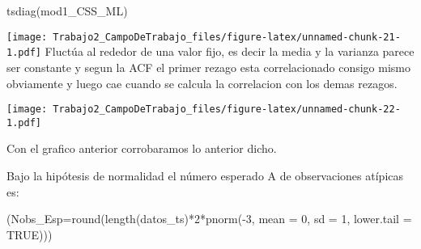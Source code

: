 \documentclass[
]{article}
\newenvironment{Shaded}{\begin{snugshade}}{\end{snugshade}}
\newcommand{\AttributeTok}[1]{\textcolor[rgb]{0.77,0.63,0.00}{#1}}
\newcommand{\ConstantTok}[1]{\textcolor[rgb]{0.00,0.00,0.00}{#1}}
\newcommand{\DecValTok}[1]{\textcolor[rgb]{0.00,0.00,0.81}{#1}}
\newcommand{\FloatTok}[1]{\textcolor[rgb]{0.00,0.00,0.81}{#1}}
\newcommand{\FunctionTok}[1]{\textcolor[rgb]{0.00,0.00,0.00}{#1}}
\newcommand{\NormalTok}[1]{#1}
\newcommand{\OtherTok}[1]{\textcolor[rgb]{0.56,0.35,0.01}{#1}}
\newcommand{\SpecialCharTok}[1]{\textcolor[rgb]{0.00,0.00,0.00}{#1}}
\newcommand{\StringTok}[1]{\textcolor[rgb]{0.31,0.60,0.02}{#1}}
\begin{document}
\begin{Shaded}
\begin{Highlighting}[]
\FunctionTok{tsdiag}\NormalTok{(mod1\_CSS\_ML)}
\end{Highlighting}
\end{Shaded}

\texttt{[image: Trabajo2\_CampoDeTrabajo\_files/figure-latex/unnamed-chunk-21-1.pdf]}
Fluctúa al rededor de una valor fijo, es decir la media y la varianza
parece ser constante y segun la ACF el primer rezago esta correlacionado
consigo mismo obviamente y luego cae cuando se calcula la correlacion
con los demas rezagos.

\begin{Shaded}
\end{Shaded}

\texttt{[image: Trabajo2\_CampoDeTrabajo\_files/figure-latex/unnamed-chunk-22-1.pdf]}

Con el grafico anterior corrobaramos lo anterior dicho.

Bajo la hipótesis de normalidad el número esperado A de observaciones
atípicas es:

\begin{Shaded}
\begin{Highlighting}[]
\NormalTok{(}\AttributeTok{Nobs\_Esp=}\FunctionTok{round}\NormalTok{(}\FunctionTok{length}\NormalTok{(datos\_ts)}\SpecialCharTok{*}\DecValTok{2}\SpecialCharTok{*}\FunctionTok{pnorm}\NormalTok{(}\SpecialCharTok{{-}}\DecValTok{3}\NormalTok{, }\AttributeTok{mean =} \DecValTok{0}\NormalTok{, }\AttributeTok{sd =} \DecValTok{1}\NormalTok{, }\AttributeTok{lower.tail =} \ConstantTok{TRUE}\NormalTok{)))}
\end{Highlighting}
\end{Shaded}
\end{document}
